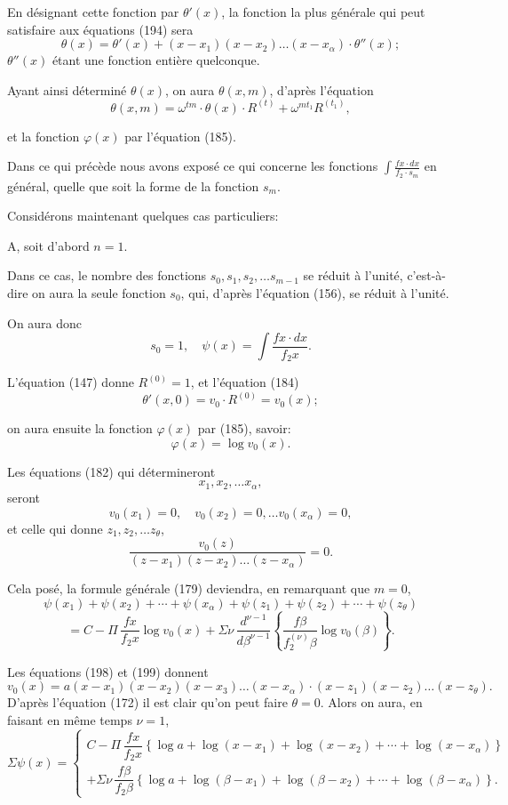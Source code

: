 \documentclass{article}
\begin{document}
En désignant cette fonction par $\theta'(x)$, la fonction la plus générale qui peut satisfaire aux équations (194) sera
\[ \theta(x) = \theta'(x)+(x-x_1)(x-x_2)\ldots(x-x_\alpha) \cdot \theta''(x); \tag{196} \]
$\theta''(x)$ étant une fonction entière quelconque.

Ayant ainsi déterminé $\theta(x)$, on aura $\theta(x,m)$, d'après l'équation
\[ \theta(x,m) = \omega^{tm} \cdot \theta(x) \cdot R^{(t)}+\omega^{mt_1}R^{(t_1)}, \tag{197} \]

et la fonction $\varphi(x)$ par l'équation (185).

Dans ce qui précède nous avons exposé ce qui concerne les fonctions $\displaystyle\int \frac{f x \cdot dx}{f_2 \cdot s_m}$ en général, quelle que soit la forme de la fonction $s_m$.

Considérons maintenant quelques cas particuliers:

A, soit d'abord $n = 1$.

Dans ce cas, le nombre des fonctions $s_0, s_1, s_2, \ldots s_{m-1}$ se
réduit à l'unité, c'est-à-dire on aura la seule fonction $s_0$, qui, d'après l'équation (156), se réduit à l'unité.

On aura donc
\[ s_0 = 1, \quad \psi(x) = \int \frac{f x \cdot dx}{f_2 x}. \]

L'équation (147) donne $R^{(0)} = 1$, et l'équation (184)
\[ \theta'(x,0) = v_0 \cdot R^{(0)} = v_0(x); \]

on aura ensuite la fonction $\varphi(x)$ par (185), savoir:
\[ \varphi(x) = \log v_0(x). \]

Les équations (182) qui détermineront
\[ x_1, x_2, \ldots x_\alpha, \]
seront
\[ v_0(x_1) = 0, \quad v_0(x_2) = 0, \ldots v_0(x_\alpha) = 0, \tag{198} \]
et celle qui donne $z_1, z_2, \ldots z_\theta$,
\[ \frac{v_0(z)}{(z-x_1)(z-x_2) \ldots (z-x_\alpha)} = 0. \tag{199} \]

Cela posé, la formule générale (179) deviendra, en remarquant que $m = 0$,
\[ \psi(x_1)+\psi(x_2)+\cdots+\psi(x_\alpha)+\psi(z_1)+\psi(z_2)+\cdots+\psi(z_\theta) \]
\[ = C - \Pi\,\frac{f x}{f_2 x}\log v_0(x) + \Sigma\nu\,\frac{d^{\nu-1}}{d\beta^{\nu-1}} \left\{ \frac{f\beta}{f_2^{(\nu)}\beta}\log v_0(\beta) \right\}. \tag{200} \]

Les équations (198) et (199) donnent
\[ v_0(x) = a(x-x_1)(x-x_2)(x-x_3) \ldots (x-x_\alpha) \cdot (x-z_1)(x-z_2) \ldots (x-z_\theta). \]
D'après l'équation (172) il est clair qu'on peut faire $\theta = 0$. Alors on aura, en faisant en même temps $\nu = 1$,
\[ \Sigma\psi(x) = \begin{cases}
C-\Pi\,\dfrac{f x}{f_2 x}\left\{\log a+\log(x-x_1)+\log(x-x_2)+\cdots+\log(x-x_\alpha)\right\} \\
+ \Sigma\nu\,\dfrac{f\beta}{f_2\beta}\left\{\log a+\log(\beta-x_1)+\log(\beta-x_2)+\cdots+\log(\beta-x_\alpha)\right\}.
\end{cases} \]
\end{document}
